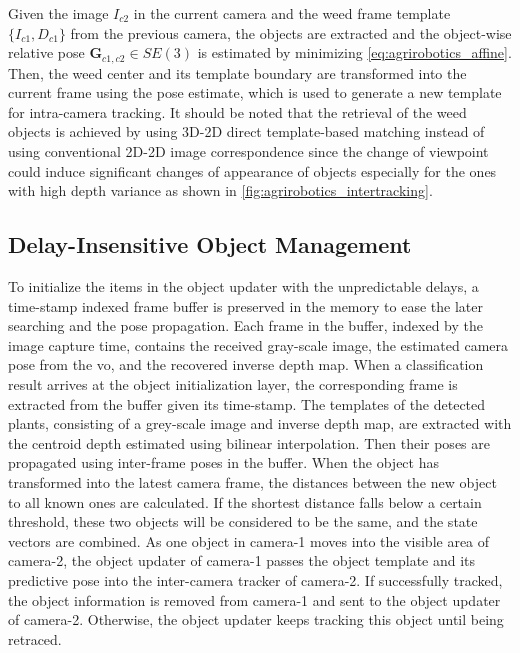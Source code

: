 Given the image $I_{c2}$ in the current camera and the weed frame template $\{ I_{c1}, D_{c1} \}$ from the previous camera, the objects are extracted and the object-wise relative pose $\mathbf{G}_{c1,c2} \in SE(3)$ is estimated by minimizing \ref{eq:agrirobotics_affine}. 
Then, the weed center and its template boundary are transformed into the current frame using the pose estimate, which is used to generate a new template for intra-camera tracking. 
It should be noted that the retrieval of the weed objects is achieved by using 3D-2D direct template-based matching instead of using conventional 2D-2D image correspondence since the change of viewpoint could induce significant changes of appearance of objects especially for the ones with high depth variance as shown in \ref{fig:agrirobotics_intertracking}.

\subsection{Delay-Insensitive Object Management}

To initialize the items in the object updater with the unpredictable delays, a time-stamp indexed frame buffer is preserved in the memory to ease the later searching and the pose propagation. 
Each frame in the buffer, indexed by the image capture time, contains the received gray-scale image, the estimated camera pose from the \acrshort{vo}, and the recovered inverse depth map. 
When a classification result arrives at the object initialization layer, the corresponding frame is extracted from the buffer given its time-stamp. 
The templates of the detected plants, consisting of a grey-scale image and inverse depth map, are extracted with the centroid depth estimated using bilinear interpolation. 
Then their poses are propagated using inter-frame poses in the buffer. When the object has transformed into the latest camera frame, the distances between the new object to all known ones are calculated. 
If the shortest distance falls below a certain threshold, these two objects will be considered to be the same, and the state vectors are combined. 
As one object in camera-1 moves into the visible area of camera-2, the object updater of camera-1 passes the object template and its predictive pose into the inter-camera tracker of camera-2. 
If successfully tracked, the object information is removed from camera-1 and sent to the object updater of camera-2. Otherwise, the object updater keeps tracking this object until being retraced.

